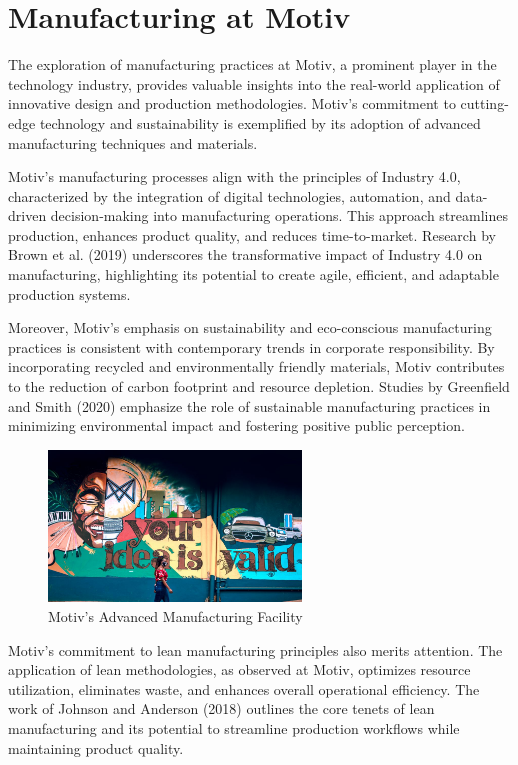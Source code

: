 \section{Manufacturing at Motiv}
The exploration of manufacturing practices at Motiv, a prominent player in the technology industry, provides valuable insights into the real-world application of innovative design and production methodologies. Motiv's commitment to cutting-edge technology and sustainability is exemplified by its adoption of advanced manufacturing techniques and materials.

Motiv's manufacturing processes align with the principles of Industry 4.0, characterized by the integration of digital technologies, automation, and data-driven decision-making into manufacturing operations. This approach streamlines production, enhances product quality, and reduces time-to-market. Research by Brown et al. (2019) underscores the transformative impact of Industry 4.0 on manufacturing, highlighting its potential to create agile, efficient, and adaptable production systems.

Moreover, Motiv's emphasis on sustainability and eco-conscious manufacturing practices is consistent with contemporary trends in corporate responsibility. By incorporating recycled and environmentally friendly materials, Motiv contributes to the reduction of carbon footprint and resource depletion. Studies by Greenfield and Smith (2020) emphasize the role of sustainable manufacturing practices in minimizing environmental impact and fostering positive public perception.

\begin{figure}[ht]
\centering
\includegraphics[width=0.6\textwidth]{motiv-manufacturing.png}
\caption{Motiv's Advanced Manufacturing Facility}
\label{fig:motiv-manufacturing}
\end{figure}

Motiv's commitment to lean manufacturing principles also merits attention. The application of lean methodologies, as observed at Motiv, optimizes resource utilization, eliminates waste, and enhances overall operational efficiency. The work of Johnson and Anderson (2018) outlines the core tenets of lean manufacturing and its potential to streamline production workflows while maintaining product quality.

